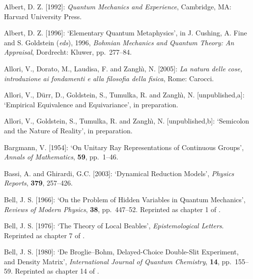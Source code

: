 \documentclass[12pt]{article}
\begin{document}
\begin{thebibliography}{29}

 Albert, D. Z. [1992]: \textit{Quantum Mechanics and Experience}, Cambridge, MA: Harvard University Press.

 Albert, D. Z. [1996]: `Elementary Quantum Metaphysics', 
	in J. Cushing, A. Fine and S. Goldstein (\textit{eds}), 1996,
	{\it {Bohmian Mechanics and Quantum Theory: An Appraisal}}, 
	Dordrecht: Kluwer, pp.~277--84.

	Allori, V., Dorato, M., Laudisa, F. and Zangh\`\i, N. [2005]: 
	\textit{La natura delle cose, introduzione ai fondamenti e alla 
	filosofia della fisica}, Rome: Carocci.

  Allori, V., D\"urr, D., Goldstein, S., Tumulka, R. and Zangh\`\i, N. [unpublished,a]:
  `Empirical Equivalence and Equivariance', in preparation.

  Allori, V., Goldstein, S., Tumulka, R. and Zangh\`\i, N. [unpublished,b]:
  `Semicolon and the Nature of Reality', in preparation.

 Bargmann, V. [1954]: `On Unitary Ray Representations of Continuous Groups',   
\textit{Annals of Mathematics}, \textbf{ 59}, pp.~1--46.

 Bassi, A. and Ghirardi, G.C. [2003]:
 `Dynamical Reduction Models',
  \textit{Physics Reports}, \textbf{379}, 257--426. 
  
 Bell, J. S. [1966]: `On the Problem of Hidden Variables in
  Quantum Mechanics', \textit{Reviews of Modern Physics}, \textbf{38}, pp.~447--52.
  Reprinted as chapter 1 of \citep{Bell87b}.

 Bell, J. S. [1976]: `The Theory of Local Beables',
  \textit{Epistemological Letters}. Reprinted as chapter 7 of
  \citep{Bell87b}.

 Bell, J. S. [1980]: `De Broglie--Bohm, Delayed-Choice
   Double-Slit Experiment, and Density Matrix',
   \textit{International Journal of Quantum Chemistry}, \textbf{14},
   pp.~155--59. Reprinted as
   chapter 14 of \citep{Bell87b}.


\end{thebibliography}
\end{document}
